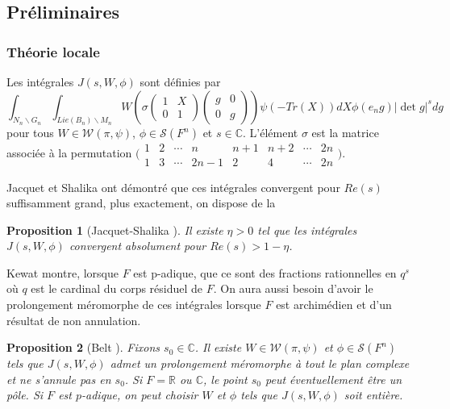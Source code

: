 \documentclass{amsart}
\newtheorem{proposition}{Proposition}[section]
\begin{document}
\subsection{Préliminaires}

\subsubsection{Théorie locale}
Les intégrales $J(s, W, \phi)$ sont définies par
 \begin{equation}
\int_{N_n\backslash{G_n}} \int_{Lie(B_n)\backslash{M_n}} W\left(\sigma \begin{pmatrix}
1 & X \\
0 & 1
\end{pmatrix}\begin{pmatrix}
g & 0 \\
0 & g
\end{pmatrix}\right)\psi(-Tr(X))dX\phi(e_ng)|\det g|^s dg
 \end{equation}
pour tous $W \in \mathcal{W}(\pi, \psi)$, $\phi \in \mathcal{S}(F^n)$ et $s \in \mathbb{C}$. L'élément $\sigma$ est la matrice associée à la permutation $\bigl(\begin{smallmatrix}
    1 & 2 & \cdots & n & n+1 & n+2 & \cdots & 2n \\
    1 & 3 & \cdots &  2n-1  & 2 & 4 & \cdots & 2n
  \end{smallmatrix}\bigr).$
  
  Jacquet et Shalika ont démontré que ces intégrales convergent pour $Re(s)$ suffisamment grand, plus exactement, on dispose de la
  \begin{proposition}[Jacquet-Shalika \cite{jacquet-shalika}]
  Il existe $\eta > 0$ tel que les intégrales $J(s, W, \phi)$ convergent absolument pour $Re(s) > 1 - \eta$.
  \end{proposition}
  
  Kewat montre, lorsque $F$ est p-adique, que ce sont des fractions rationnelles en $q^{s}$ où $q$ est le cardinal du corps résiduel de $F$. On aura aussi besoin d'avoir le prolongement méromorphe de ces intégrales lorsque $F$ est archimédien et d'un résultat de non annulation.
  \begin{proposition}[Belt \cite{belt}]
  \label{nonzero}
  Fixons $s_0 \in \mathbb{C}$. Il existe $W \in \mathcal{W}(\pi, \psi)$ et $\phi \in \mathcal{S}(F^n)$ tels que $J(s,W,\phi)$ admet un prolongement méromorphe à tout le plan complexe et ne s'annule pas en $s_0$. Si $F=\mathbb{R}$ ou $\mathbb{C}$, le point $s_0$ peut éventuellement être un pôle. Si $F$ est $p$-adique, on peut choisir $W$ et $\phi$ tels que $J(s, W, \phi)$ soit entière.
  \end{proposition}
  
\end{document}
